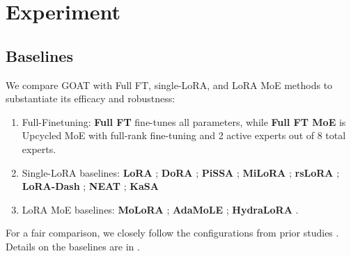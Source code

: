 




\section{Experiment}

\subsection{Baselines}

We compare GOAT with Full FT, single-LoRA, and LoRA MoE methods to substantiate its efficacy and robustness:
\begin{enumerate}
\item Full-Finetuning: \textbf{Full FT} fine-tunes all parameters, while \textbf{Full FT MoE} is Upcycled MoE with full-rank fine-tuning and 2 active experts out of 8 total experts.
\item Single-LoRA baselines: \textbf{LoRA} \cite{hulora}; \textbf{DoRA} \cite{liudora}; \textbf{PiSSA} \cite{meng2024pissa}; \textbf{MiLoRA} \cite{wang2024miloraharnessingminorsingular}; \textbf{rsLoRA} \cite{kalajdzievski2023rankstabilizationscalingfactor}; \textbf{LoRA-Dash} \cite{si2024unleashingpowertaskspecificdirections}; \textbf{NEAT} \cite{zhong2024neatnonlinearparameterefficientadaptation}; \textbf{KaSA} \cite{wang2024kasaknowledgeawaresingularvalueadaptation} 
\item LoRA MoE baselines: \textbf{MoLoRA} \cite{zadouri2024pushing}; \textbf{AdaMoLE} \cite{liu2024adamole}; \textbf{HydraLoRA} \cite{tian2024hydraloraasymmetricloraarchitecture}.
\end{enumerate}
For a fair comparison, we closely follow the configurations from prior studies \cite{hulora,meng2024pissa,wang2024loraprolowrankadaptersproperly}. Details on the baselines are in .

